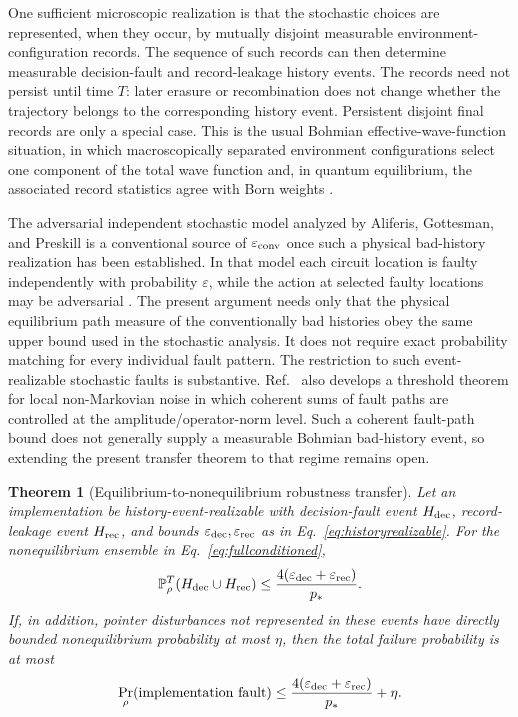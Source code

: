 \documentclass[pdflatex,sn-mathphys-num]{sn-jnl}
\theoremstyle{thmstyleone}
\newtheorem{theorem}{Theorem}
\begin{document}
One sufficient microscopic realization is that the stochastic choices are represented, when they occur, by mutually disjoint measurable environment-configuration records. The sequence of such records can then determine measurable decision-fault and record-leakage history events. The records need not persist until time $T$: later erasure or recombination does not change whether the trajectory belongs to the corresponding history event. Persistent disjoint final records are only a special case. This is the usual Bohmian effective-wave-function situation, in which macroscopically separated environment configurations select one component of the total wave function and, in quantum equilibrium, the associated record statistics agree with Born weights \cite{DurrGoldsteinZanghi1992}.

The adversarial independent stochastic model analyzed by Aliferis, Gottesman, and Preskill is a conventional source of $\varepsilon_{\rm conv}$ once such a physical bad-history realization has been established. In that model each circuit location is faulty independently with probability $\varepsilon$, while the action at selected faulty locations may be adversarial \cite{AliferisGottesmanPreskill2006}. The present argument needs only that the physical equilibrium path measure of the conventionally bad histories obey the same upper bound used in the stochastic analysis. It does not require exact probability matching for every individual fault pattern. The restriction to such event-realizable stochastic faults is substantive. Ref.~\cite{AliferisGottesmanPreskill2006} also develops a threshold theorem for local non-Markovian noise in which coherent sums of fault paths are controlled at the amplitude/operator-norm level. Such a coherent fault-path bound does not generally supply a measurable Bohmian bad-history event, so extending the present transfer theorem to that regime remains open.

\begin{theorem}[Equilibrium-to-nonequilibrium robustness transfer]
\label{thm:transfer}
Let an implementation be history-event-realizable with decision-fault event $H_{\rm dec}$, record-leakage event $H_{\rm rec}$, and bounds $\varepsilon_{\rm dec},\varepsilon_{\rm rec}$ as in Eq.~\eqref{eq:historyrealizable}. For the nonequilibrium ensemble in Eq.~\eqref{eq:fullconditioned},
\begin{equation}
\mathbb P_\rho^T(H_{\rm dec}\cup H_{\rm rec})
\le\frac{4(\varepsilon_{\rm dec}+\varepsilon_{\rm rec})}{p_*}.
\label{eq:transferbound}
\end{equation}
If, in addition, pointer disturbances not represented in these events have directly bounded nonequilibrium probability at most $\eta$, then the total failure probability is at most
\begin{equation}
\Pr_{\rho}(\mathrm{implementation\ fault})
\le \frac{4(\varepsilon_{\rm dec}+\varepsilon_{\rm rec})}{p_*}+\eta.
\label{eq:transfereta}
\end{equation}
\end{theorem}
\end{document}
